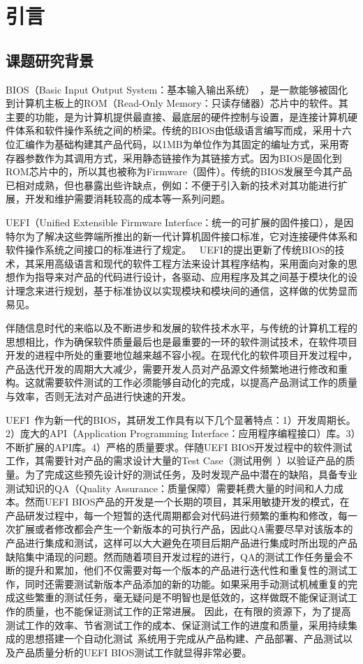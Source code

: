 \chapter{引言}
\label{cha:intro}

\section{课题研究背景}

BIOS（Basic Input Output System：基本输入输出系统）~\cite{1, 2}，是一款能够被固化到计算机主板上的ROM（Read-Only Memory：只读存储器）芯片中的软件。其主要的功能，是为计算机提供最直接、最底层的硬件控制与设置，是连接计算机硬件体系和软件操作系统之间的桥梁。传统的BIOS由低级语言编写而成，采用十六位汇编作为基础构建其产品代码，以1MB为单位作为其固定的编址方式，采用寄存器参数作为其调用方式，采用静态链接作为其链接方式。因为BIOS是固化到ROM芯片中的，所以其也被称为Firmware（固件）。传统的BIOS发展至今其产品已相对成熟，但也暴露出些许缺点，例如：不便于引入新的技术对其功能进行扩展，开发和维护需要消耗较高的成本等一系列问题。

UEFI（Unified Extensible Firmware Interface：统一的可扩展的固件接口），是因特尔为了解决这些弊端所推出的新一代计算机固件接口标准，它对连接硬件体系和软件操作系统之间接口的标准进行了规定。~\cite{3} UEFI的提出更新了传统BIOS的技术，其采用高级语言和现代的软件工程方法来设计其程序结构，采用面向对象的思想作为指导来对产品的代码进行设计，各驱动、应用程序及其之间基于模块化的设计理念来进行规划，基于标准协议以实现模块和模块间的通信，这样做的优势显而易见。

伴随信息时代的来临以及不断进步和发展的软件技术水平，与传统的计算机工程的思想相比，作为确保软件质量最后也是最重要的一环的软件测试技术，在软件项目开发的进程中所处的重要地位越来越不容小视。在现代化的软件项目开发过程中，产品迭代开发的周期大大减少，需要开发人员对产品源文件频繁地进行修改和重构。这就需要软件测试的工作必须能够自动化的完成，以提高产品测试工作的质量与效率，否则无法对产品进行快速的开发。~\cite{4}

UEFI~\cite{5, 6}作为新一代的BIOS，其研发工作具有以下几个显著特点：1）开发周期长。2）庞大的API（Application Programming Interface：应用程序编程接口）库。3）不断扩展的API库。4）严格的质量要求。伴随UEFI BIOS开发过程中的软件测试工作，其需要针对产品的需求设计大量的Test Case（测试用例~\cite{7, 8}）以验证产品的质量。为了完成这些预先设计好的测试任务，及时发现产品中潜在的缺陷，具备专业测试知识的QA（Quality Assurance：质量保障）需要耗费大量的时间和人力成本。然而UEFI BIOS产品的开发是一个长期的项目，其采用敏捷开发的模式，在产品研发过程中，每一个短暂的迭代周期都会对代码进行频繁的重构和修改，每一次扩展或者修改都会产生一个新版本的可执行产品，因此QA需要尽早对该版本的产品进行集成和测试，这样可以大大避免在项目后期产品进行集成时所出现的产品缺陷集中涌现的问题。然而随着项目开发过程的进行，QA的测试工作任务量会不断的提升和累加，他们不仅需要对每一个版本的产品进行迭代性和重复性的测试工作，同时还需要测试新版本产品添加的新的功能。如果采用手动测试机械重复的完成这些繁重的测试任务，毫无疑问是不明智也是低效的，这样做既不能保证测试工作的质量，也不能保证测试工作的正常进展。 因此，在有限的资源下，为了提高测试工作的效率、节省测试工作的成本、保证测试工作的进度和质量，采用持续集成的思想搭建一个自动化测试~\cite{9, 10, 11}系统用于完成从产品构建、产品部署、产品测试以及产品质量分析的UEFI BIOS测试工作就显得非常必要。

